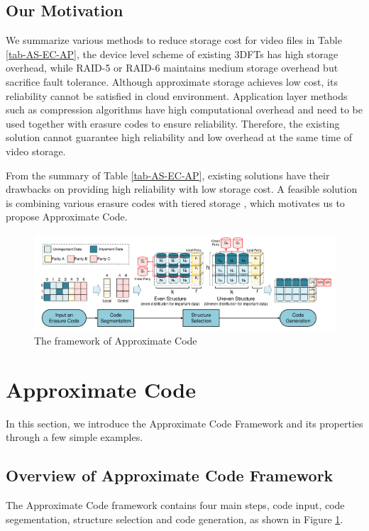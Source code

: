 \documentclass[sigconf]{acmart}
\begin{document}
\subsection{Our Motivation}
We summarize various methods to reduce storage cost for video files in Table \ref{tab-AS-EC-AP}, the device level scheme of existing 3DFTs has high storage overhead, while RAID-5 or RAID-6 maintains medium storage overhead but sacrifice fault tolerance. Although approximate storage achieves low cost, its reliability cannot be satisfied in cloud environment. Application layer methods such as compression algorithms have high computational overhead and need to be used together with erasure codes to ensure reliability.
Therefore, the existing solution cannot guarantee high reliability and low overhead at the same time of video storage.

From the summary of Table \ref{tab-AS-EC-AP}, existing solutions have their drawbacks on providing high reliability with low storage cost. 
A feasible solution is combining various erasure codes with tiered storage \cite{krish2014hats} \cite{wang2014balancing} \cite{zhang2010automated} \cite{udipi2012lot}, which motivates us to propose Approximate Code.

\begin{figure}[ht!]
\centering
\includegraphics[width=0.95\linewidth]{photo/Framework-v3.pdf}
\caption{The framework of Approximate Code}
\label{fig-framework}
\end{figure}

\section{Approximate Code}\label{ApCode}
In this section, we introduce the Approximate Code Framework and its properties through a few simple examples.

\subsection{Overview of Approximate Code Framework}
The Approximate Code framework contains four main steps, code input, code segementation, structure selection and code generation, as shown in Figure \ref{fig-framework}.
\end{document}
